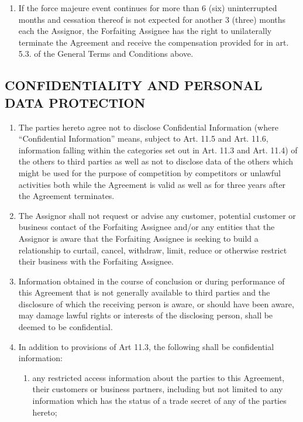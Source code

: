 \documentclass[a4paper]{article}
\begin{document}
\begin{multicols}{2}
\begin{enumerate}
  \item{If the force majeure event continues for more than 6 (six)
      uninterrupted months and cessation thereof is not expected for
      another 3 (three) months each the Assignor, the Forfaiting
      Assignee has the right to unilaterally terminate the Agreement
      and receive the compensation provided for in art. 5.3. of the
      General Terms and Conditions above.}
  \end{enumerate}

  \subsection{CONFIDENTIALITY AND PERSONAL DATA PROTECTION}

  \begin{enumerate}
  \item{The parties hereto agree not to disclose Confidential
      Information (where “Confidential Information” means, subject to
      Art. 11.5 and Art. 11.6, information falling within the
      categories set out in Art. 11.3 and Art. 11.4) of the others to third
      parties as well as not to disclose data of the others which
      might be used for the purpose of competition by competitors or
      unlawful activities both while the Agreement is valid as well as
      for three years after the Agreement terminates.}

  \item{The Assignor shall not request or advise any customer,
      potential customer or business contact of the Forfaiting
      Assignee and/or any entities that the Assignor is aware that the
      Forfaiting Assignee is seeking to build a relationship to
      curtail, cancel, withdraw, limit, reduce or otherwise restrict
      their business with the Forfaiting Assignee.}

  \item{Information obtained in the course of conclusion or during
      performance of this Agreement that is not generally available to
      third parties and the disclosure of which the receiving person
      is aware, or should have been aware, may damage lawful rights or
      interests of the disclosing person, shall be deemed to be
      confidential.}

  \item{In addition to provisions of Art 11.3, the following shall be
      confidential information:}

    \begin{enumerate}
    \item{any restricted access information about the parties to this
        Agreement, their customers or business partners, including but
        not limited to any information which has the status of a trade
        secret of any of the parties hereto;}


\end{enumerate}
\end{enumerate}
\end{multicols}
\end{document}
